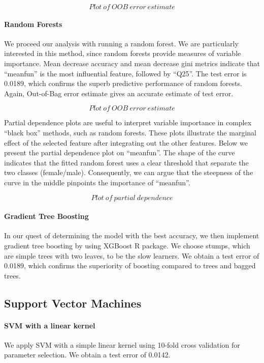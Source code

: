 $$ Plot ~ of ~ OOB~error~ estimate$$ 

\paragraph{Random Forests}
We proceed our analysis with running a random forest. We are particularly interested in this method, since random forests provide measures of variable importance. Mean decrease accuracy and mean decrease gini metrics indicate that ``meanfun'' is the most influential feature, followed by ``Q25''. The test error is \num{0.0189}, which confirms the superb predictive performance of random forests. Again, Out-of-Bag error estimate gives an accurate estimate of test error.

$$ Plot ~ of ~ OOB~error~ estimate$$ 

Partial dependence plots are useful to interpret variable importance in complex ``black box'' methods, such as random forests. These plots illustrate the marginal effect of the selected feature after integrating out the other features. Below we present the partial dependence plot on ``meanfun''. The shape of the curve indicates that the fitted random forest uses a clear threshold that separate the two classes (female/male). Consequently, we can argue that the steepness of the curve in the middle pinpoints the importance of ``meanfun''. 

$$ Plot ~ of ~ partial~dependence$$

\paragraph{Gradient Tree Boosting}
In our quest of determining the model with the best accuracy, we then implement gradient tree boosting by using XGBoost R package. We choose stumps, which are simple trees with two leaves, to be the slow learners. We obtain a test error of \num{0.0189}, which confirms the superiority of boosting compared to trees and bagged trees.

\subsection{Support Vector Machines}
\paragraph{SVM with a linear kernel}
We apply SVM with a simple linear kernel using \num{10}-fold cross validation for parameter selection. We obtain a test error of \num{0.0142}.

